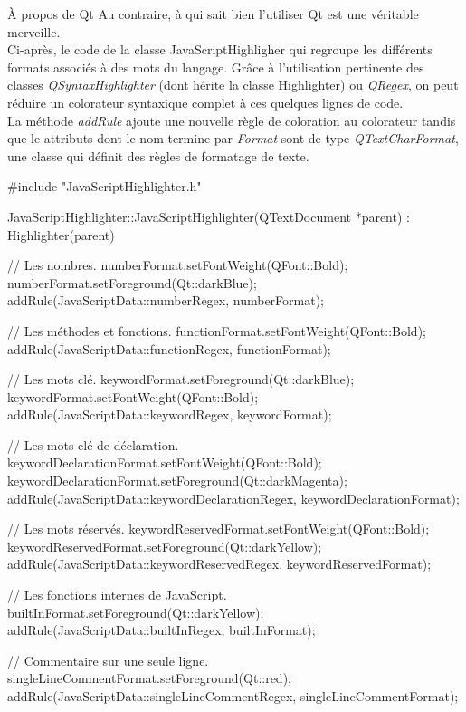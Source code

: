 \documentclass[a4paper, 12pt]{report}
\begin{document}
\begin{chapter}
\begin{section}{À propos de Qt}
			Au contraire, à qui sait bien l'utiliser \gls{Qt} est une véritable merveille.\\
			Ci-après, le code de la classe JavaScriptHighligher qui regroupe les différents formats associés à des mots du langage.
			Grâce à l'utilisation pertinente des classes \emph{QSyntaxHighlighter} (dont hérite la classe Highlighter) ou \emph{QRegex}, on peut
			réduire un colorateur syntaxique complet à ces quelques lignes de code.\\

			La méthode \emph{addRule} ajoute une nouvelle règle de coloration au colorateur tandis que le attributs dont le nom termine par
			\emph{Format} sont de type \emph{QTextCharFormat}, une classe qui définit des règles de formatage de texte.
			\begin{center}
			\begin{cppcode}
#include "JavaScriptHighlighter.h"

JavaScriptHighlighter::JavaScriptHighlighter(QTextDocument *parent)
: Highlighter(parent)
{
    // Les nombres.
    numberFormat.setFontWeight(QFont::Bold);
    numberFormat.setForeground(Qt::darkBlue);
    addRule(JavaScriptData::numberRegex, numberFormat);

    // Les méthodes et fonctions.
    functionFormat.setFontWeight(QFont::Bold);
    addRule(JavaScriptData::functionRegex, functionFormat);

    // Les mots clé.
    keywordFormat.setForeground(Qt::darkBlue);
    keywordFormat.setFontWeight(QFont::Bold);
    addRule(JavaScriptData::keywordRegex, keywordFormat);

    // Les mots clé de déclaration.
    keywordDeclarationFormat.setFontWeight(QFont::Bold);
    keywordDeclarationFormat.setForeground(Qt::darkMagenta);
    addRule(JavaScriptData::keywordDeclarationRegex, keywordDeclarationFormat);

    // Les mots réservés.
    keywordReservedFormat.setFontWeight(QFont::Bold);
    keywordReservedFormat.setForeground(Qt::darkYellow);
    addRule(JavaScriptData::keywordReservedRegex, keywordReservedFormat);

    // Les fonctions internes de JavaScript.
    builtInFormat.setForeground(Qt::darkYellow);
    addRule(JavaScriptData::builtInRegex, builtInFormat);

    // Commentaire sur une seule ligne.
    singleLineCommentFormat.setForeground(Qt::red);
    addRule(JavaScriptData::singleLineCommentRegex, singleLineCommentFormat);

}
\end{cppcode}
\end{center}
\end{section}
\end{chapter}
\end{document}
